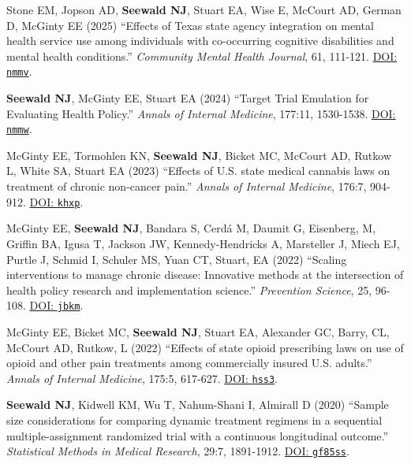 \documentclass[letterpaper,11pt]{article} %
\begin{document}
\begin{etaremune}
        \item Stone EM, Jopson AD, \textbf{Seewald NJ}, Stuart EA, Wise E, McCourt AD, German D, McGinty EE (2025) ``Effects of Texas state agency integration on mental health service use among individuals with co-occurring cognitive disabilities and mental health conditions.'' \textit{Community Mental Health Journal}, 61, 111-121. \href{https://doi.org/nmmv}{DOI: \texttt{nmmv}}.
        
		\item \textbf{Seewald NJ}, McGinty EE, Stuart EA (2024) ``Target Trial Emulation for Evaluating Health Policy.'' \textit{Annals of Internal Medicine}, 177:11, 1530-1538. \href{https://doi.org/nmmw}{DOI: \texttt{nmmw}}.
		
		\item McGinty EE, Tormohlen KN, \textbf{Seewald NJ}, Bicket MC, McCourt AD, Rutkow L, White SA, Stuart EA (2023) ``Effects of U.S. state medical cannabis laws on treatment of chronic non-cancer pain.'' \textit{Annals of Internal Medicine}, 176:7, 904-912. \href{https://doi.org/khxp}{DOI: \texttt{khxp}}.
		
		\item McGinty EE, \textbf{Seewald NJ}, Bandara S, Cerd\'{a} M, Daumit G, Eisenberg, M, Griffin BA, Igusa T, Jackson JW, Kennedy-Hendricks A, Marsteller J, Miech EJ, Purtle J, Schmid I, Schuler MS, Yuan CT, Stuart, EA (2022) ``Scaling interventions to manage chronic disease: Innovative methods at the intersection of health policy research and implementation science.'' \textit{Prevention Science}, 25, 96-108. \href{https://doi.org/jbkm}{DOI: \texttt{jbkm}}.
		
		\item McGinty EE, Bicket MC, \textbf{Seewald NJ}, Stuart EA, Alexander GC, Barry, CL, McCourt AD, Rutkow, L (2022) ``Effects of state opioid prescribing laws on use of opioid and other pain treatments among commercially insured U.S. adults.'' \textit{Annals of Internal Medicine}, 175:5, 617-627. \href{https://doi.org/hss3}{DOI: \texttt{hss3}}.
		
        \item\textbf{Seewald NJ}, Kidwell KM, Wu T, Nahum-Shani I, Almirall D (2020) ``Sample size considerations for comparing dynamic treatment regimens in a sequential multiple-assignment randomized trial with a continuous longitudinal outcome.'' \textit{Statistical Methods in Medical Research}, 29:7, 1891-1912. \href{https://doi.org/gf85ss}{DOI: \texttt{gf85ss}}.
        

\end{etaremune}
\end{document}
